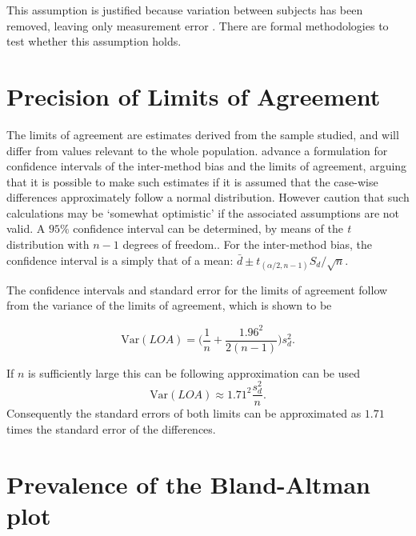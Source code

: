 \documentclass[12pt, a4paper]{report}
\theoremstyle{plain}
\theoremstyle{definition}
\theoremstyle{remark}
\begin{document}
This assumption is justified because variation between subjects has been removed, leaving only measurement error \citep{BA86}. There are formal methodologies to test whether this assumption holds.





\section{Precision of Limits of Agreement}

	The limits of agreement are estimates derived from the sample studied, and will differ from values relevant to the whole
	population. \citet*{BA86} advance a formulation for confidence
	intervals of the inter-method bias and the limits of agreement, arguing that it is possible to make such estimates if it is assumed that the case-wise differences approximately follow a normal distribution. However \citet*{BA99} caution that such calculations may be `somewhat
	optimistic' if the associated assumptions are not valid. A $95\%$ confidence interval can be determined, by means of the
	\emph{t} distribution with $n-1$ degrees of freedom.. For the inter-method bias, the confidence interval is a simply that of a mean: $\bar{d} \pm t_{(\alpha/2,n-1)} S_{d}/\sqrt{n}$.
	
	The confidence intervals and standard error for the limits of agreement follow from the variance of the limits of agreement, which is shown to be
	
	\[
	\mbox{Var}(LOA) = \bigg(\frac{1}{n}+\frac{1.96^{2}}{2(n-1)}\bigg)s_{d}^{2}.
	\]
	
	If $n$ is sufficiently large this can be following approximation can be used
	\[
	\mbox{Var}(LOA) \approx 1.71^{2}\frac{s_{d}^{2}}{n}.
	\]
	Consequently the standard errors of both limits can be approximated as $1.71$ times the standard error of the differences.
	


 


		


\section{Prevalence of the Bland-Altman plot}
\end{document}
